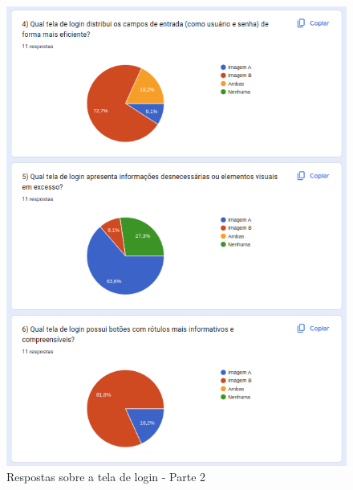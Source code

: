 \begin{figure}[!h]
	\begin{center}
	    \includegraphics[scale=0.7]{figs/Answers/Professionals/05.png}
	\end{center}
	\caption{\label{APC_TL02}Respostas sobre a tela de login - Parte 2}
\end{figure}

\newpage

